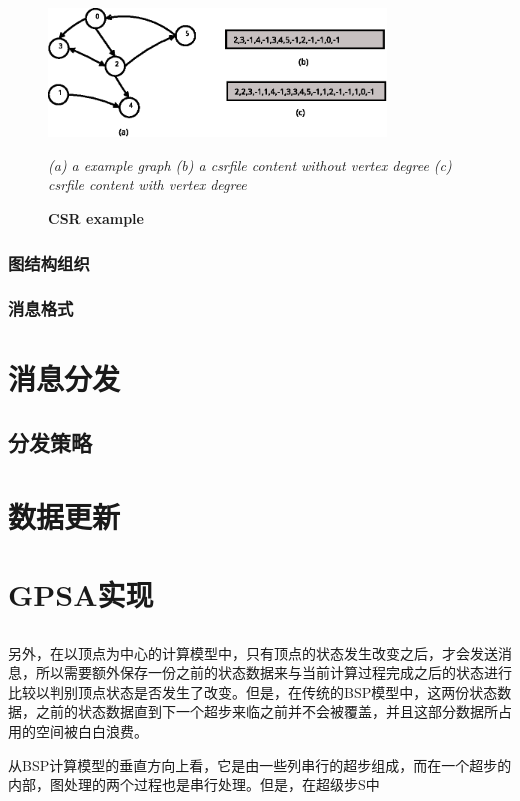 \begin{figure}[htbp]

 \begin{minipage}[]{0.5\textwidth}
 \centering
     \includegraphics[width=0.8\textwidth,angle=0,scale=1.2]{myfigures/csrdataformat.eps}
\end{minipage}
    \caption{\textbf{CSR example}  }
	\textit{(a) a example graph (b) a csrfile content without vertex degree (c) csrfile content with vertex degree}
    \label{figure:csrexample}

\end{figure}

\subsubsection{图结构组织}

\subsubsection{消息格式}


\section{消息分发}
\subsection{}
\subsection{分发策略}

\section{数据更新}


\section{GPSA实现}
\subsection{}

另外，在以顶点为中心的计算模型中，只有顶点的状态发生改变之后，才会发送消息，所以需要额外保存一份之前的状态数据来与当前计算过程完成之后的状态进行比较以判别顶点状态是否发生了改变。但是，在传统的BSP模型中，这两份状态数据，之前的状态数据直到下一个超步来临之前并不会被覆盖，并且这部分数据所占用的空间被白白浪费。

从BSP计算模型的垂直方向上看，它是由一些列串行的超步组成，而在一个超步的内部，图处理的两个过程也是串行处理。但是，在超级步S中
